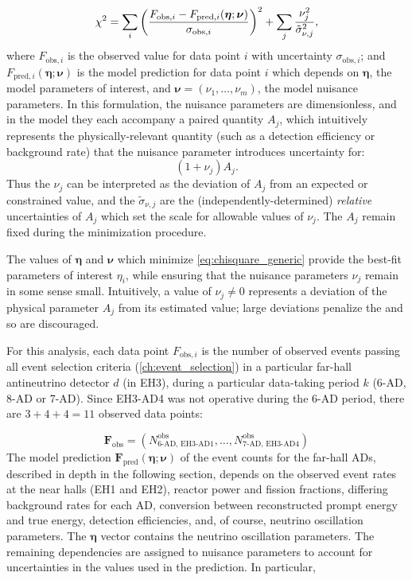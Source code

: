 \begin{equation}
    \label{eq:chisquare_generic}
    \chi^2 = \sum_i \left(
        \frac{F_{\text{obs},i} - F_{\text{pred},i}(\boldsymbol{\eta};\boldsymbol{\nu})}
            {\sigma_{\text{obs},i}}
        \right)^2
        +
        \sum_j \frac{\nu_j^2}{\tilde{\sigma}_{\nu,j}^2},
\end{equation}
where $F_{\text{obs},i}$ is the observed value for data point $i$
with uncertainty $\sigma_{\text{obs},i}$;
and $F_{\text{pred},i}(\boldsymbol{\eta};\boldsymbol{\nu})$
is the model prediction for data point $i$
which depends on $\boldsymbol{\eta}$, the model parameters of interest,
and $\boldsymbol{\nu}=(\nu_1, \ldots, \nu_m)$,
the model nuisance parameters.
In this formulation, the nuisance parameters are dimensionless,
and in the model they each accompany a paired quantity $A_j$,
which intuitively represents the physically-relevant quantity
(such as a detection efficiency or background rate)
that the nuisance parameter introduces uncertainty for:
\begin{equation}
    (1+\nu_j)A_j.
\end{equation}
Thus the $\nu_j$ can be interpreted as the deviation of $A_j$
from an expected or constrained value,
and the $\tilde{\sigma}_{\nu,j}$ are the (independently-determined)
\emph{relative} uncertainties of $A_j$
which set the scale for allowable values of $\nu_j$.
The $A_j$ remain fixed during the minimization procedure.

The values of $\boldsymbol{\eta}$ and $\boldsymbol{\nu}$
which minimize \cref{eq:chisquare_generic}
provide the best-fit parameters of interest $\eta_i$,
while ensuring that the nuisance parameters $\nu_j$
remain in some sense small.
Intuitively, a value of $\nu_j \neq 0$ represents
a deviation of the physical parameter $A_j$ from its estimated value;
large deviations penalize the \chisquare{} and so are discouraged.

For this analysis, each data point $F_{\text{obs},i}$
is the number of observed events passing all event selection criteria
(\cref{ch:event_selection})
in a particular far-hall antineutrino detector $d$ (in EH3),
during a particular data-taking period $k$ (6-AD, 8-AD or 7-AD).
Since EH3-AD4 was not operative during the 6-AD period,
there are $3 + 4 + 4 = 11$ observed data points:

\begin{equation}
    \mathbf{F}_{\text{obs}} =
    (N^{\text{obs}}_{\text{6-AD, EH3-AD1}}, \ldots, N^{\text{obs}}_{\text{7-AD, EH3-AD4}})
\end{equation}
The model prediction
$\mathbf{F}_{\text{pred}}(\boldsymbol{\eta};\boldsymbol{\nu})$
of the event counts for the far-hall ADs,
described in depth in the following section,
depends on the observed event rates at the near halls (EH1 and EH2),
reactor power and fission fractions,
differing background rates for each AD,
conversion between reconstructed prompt energy and true \nuebar{} energy,
detection efficiencies,
and, of course, neutrino oscillation parameters.
The $\boldsymbol{\eta}$ vector contains the neutrino oscillation parameters.
The remaining dependencies are assigned to nuisance parameters
to account for uncertainties in the values used in the prediction.
In particular,

